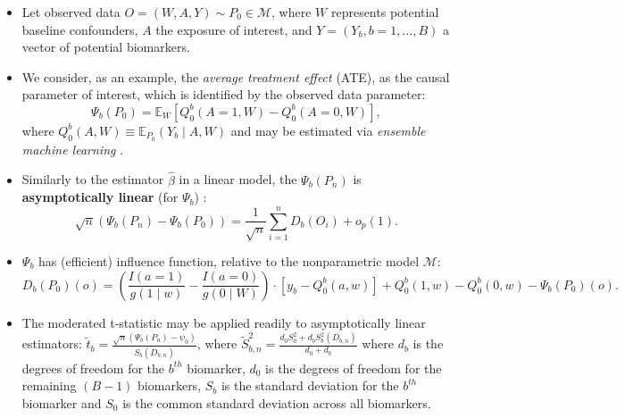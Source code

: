 \documentclass[landscape,a0paper,fontscale=0.285]{baposter} %
\newcommand{\E}{\mathbb{E}}
\newcommand{\M}{\mathcal{M}}
\newcommand{\1}{\mathbbm{1}}
\begin{document}
\begin{poster}
{\begin{itemize}
  \itemsep0.50pt
  \item Let observed data $O = (W, A, Y) \sim P_0 \in \M$, where $W$ represents
      potential baseline confounders, $A$ the exposure of interest, and
      $Y = ({Y_b}, b = 1, \dots, B)$ a vector of potential biomarkers.
  \item We consider, as an example, the \textit{average treatment effect} (ATE),
      as the causal parameter of interest, which is identified by the observed
      data parameter:
      \begin{equation}\label{ate}
        \Psi_b(P_0) = \E_W[ Q_0^b(A = 1, W) - Q_0^b(A = 0, W)],
      \end{equation}
        where $Q_0^b(A, W) \equiv \E_{P_0}(Y_b \mid A, W)$ and may be estimated
        via \textit{ensemble machine learning}
        \cite{vdl2007super,breiman1996stacked,wolpert1992stacked}.
  \item Similarly to the estimator $\hat{\beta}$ in a linear model, the
      $\Psi_b(P_n)$ is \textbf{asymptotically linear} (for $\Psi_b$)
      \cite{tsiatis2007semiparametric,vdl2011targeted}:
      \begin{equation}\label{asymp_lin}
        \sqrt{n} (\Psi_b(P_n) - \Psi_b(P_0)) = \frac{1}{\sqrt{n}} \sum_{i=1}^n
        D_b(O_i) + o_p(1).
      \end{equation}
  \item $\Psi_b$ has (efficient) influence function, relative to the
      nonparametric model $\M$:
      \begin{equation}\label{eif_ate}
        D_b(P_0)(o) = \left(\frac{I(a = 1)}{g(1 \mid w)} -
        \frac{I(a = 0)}{g(0 \mid W)}\right) \cdot [y_b - Q_0^b(a, w)] +
        Q_0^b(1, w) - Q_0^b(0, w) - \Psi_b(P_0)(o).
      \end{equation}
  \item The moderated t-statistic \cite{smyth2004linear,smyth2005limma} may be
    applied readily to asymptotically linear estimators:
    $\tilde{t}_b = \frac{\sqrt{n}(\Psi_b(P_n) - \psi_0)}{S_b(D_{b,n})}$, where
    $\tilde{S}_{b,n}^2 = \frac{d_0S_0^2 + d_bS_b^2(D_{b,n})}{d_0 + d_b}$ where
    $d_b$ is the degrees of freedom for the $b^{th}$ biomarker, $d_0$ is the
    degrees of freedom for the remaining $(B - 1)$ biomarkers, $S_b$ is the
    standard deviation for the $b^{th}$ biomarker and $S_0$ is the common
    standard deviation across all biomarkers.
\end{itemize}

}


\end{poster}
\end{document}
